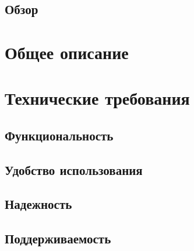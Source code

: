 \documentclass{article}
\begin{document}
\subsection{Обзор}



\section{Общее описание}



\section{Технические требования}

\subsection{Функциональность}


\subsection{Удобство использования}


\subsection{Надежность}


\subsection{Поддерживаемость}

\end{document}
